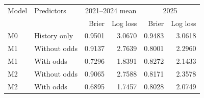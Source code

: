 \begin{tabular}{llrrrr}
\toprule
Model & Predictors & \multicolumn{2}{c}{2021--2024 mean} & \multicolumn{2}{c}{2025} \\ 
 & & Brier & Log loss & Brier & Log loss \\
\midrule
M0 & History only & 0.9501 & 3.0670 & 0.9483 & 3.0618 \\
M1 & Without odds & 0.9137 & 2.7639 & 0.8001 & 2.2960 \\
M1 & With odds & 0.7296 & 1.8391 & 0.8272 & 2.1433 \\
M2 & Without odds & 0.9065 & 2.7588 & 0.8171 & 2.3578 \\
M2 & With odds & 0.6895 & 1.7457 & 0.8028 & 2.0749 \\
\bottomrule
\end{tabular}
